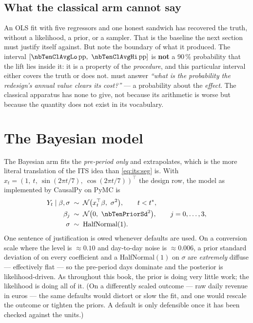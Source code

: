 \subsection*{What the classical arm cannot say}

An OLS fit with five regressors and one honest sandwich has recovered the truth, without a
likelihood, a prior, or a sampler. That is the baseline the next section must justify itself
against. But note the boundary of what it produced. The interval
$[\pp{\nbTenClAvgLo},\ \pp{\nbTenClAvgHi}]$ is \textbf{not} a 90\,\% probability that the lift
lies inside it: it is a property of the \emph{procedure}, and this particular interval either
covers the truth or does not.  must answer \emph{``what is the probability the
redesign's annual value clears its \eur{\nbTenCost} cost?''} --- a probability about the
\emph{effect}. The classical apparatus has none to give, not because its arithmetic is worse but
because the quantity does not exist in its vocabulary.

\section{The Bayesian model}
\label{sec:its:bayes}

The Bayesian arm fits the \emph{pre-period only} and extrapolates, which is the more literal
translation of the ITS idea than \cref{eq:its:seg} is. With $x_t = (1,\ t,\ \sin(2\pi t/7),\
\cos(2\pi t/7))^{\top}$ the design row, the model as implemented by CausalPy
\citep{causalpy} on PyMC \citep{salvatier2016} is
%
\begin{align}
  Y_t \mid \beta, \sigma &\;\sim\; \mathcal N\big(x_t^{\top}\beta,\ \sigma^{2}\big),
      \qquad t < t^{*}, \label{eq:its:lik}\\
  \beta_j &\;\sim\; \mathcal N\big(0,\ \nbTenPriorSd^{2}\big), \qquad j = 0,\dots,3,
      \label{eq:its:prior_b}\\
  \sigma &\;\sim\; \text{HalfNormal}(1). \label{eq:its:prior_s}
\end{align}
%
One sentence of justification is owed whenever defaults are used. On a conversion scale where the
level is $\approx 0.10$ and day-to-day noise is $\approx 0.006$, a prior standard deviation of
\nbTenPriorSd{} on every coefficient and a HalfNormal$(1)$ on $\sigma$ are \emph{extremely}
diffuse --- effectively flat --- so the \nbTenNPre{} pre-period days dominate and the posterior is
likelihood-driven. As throughout this book, the prior is doing very little work; the likelihood is
doing all of it. (On a differently scaled outcome --- raw daily revenue in euros --- the same
defaults would distort or slow the fit, and one would rescale the outcome or tighten the priors.
A default is only defensible once it has been checked against the units.)

